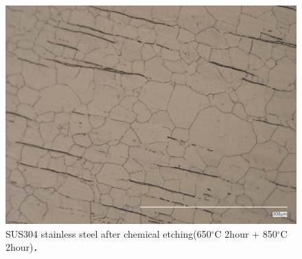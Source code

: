 \begin{figure}[htbp]
    \centering %
    \includegraphics[width=100truemm,clip]{fig/241218_304650C2h850C2h_ethcing.jpg}
    \caption{SUS304 stainless steel after chemical etching(650$^\circ$C 2hour + 850$^\circ$C 2hour)．}
    \label{fig:304850Etching}
\end{figure}
\clearpage


